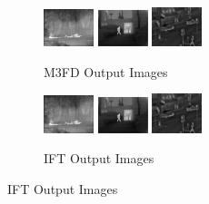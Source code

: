 \begin{figure}[htbp]
    \centering
    \begin{subfigure}[b]{\textwidth}
        \includegraphics[width=0.16\textwidth, height=0.1\textheight]{imgs/ch5/m3fd/20.jpg}
        \includegraphics[width=0.16\textwidth, height=0.1\textheight]{imgs/ch5/m3fd/12.jpg}
        \includegraphics[width=0.16\textwidth, height=0.1\textheight]{imgs/ch5/m3fd/02.jpg}
        \captionsetup{justification=raggedright,singlelinecheck=false}
        \caption{M3FD\cite{liu2022target} Output Images}
        \label{fig:ch5:met9:m3fd}
    \end{subfigure}
    \vspace{0.01cm}
    \begin{subfigure}[b]{\textwidth}
        \includegraphics[width=0.16\textwidth, height=0.1\textheight]{imgs/ch5/swinFusion/20.jpg}
        \includegraphics[width=0.16\textwidth, height=0.1\textheight]{imgs/ch5/swinFusion/12.jpg}
        \includegraphics[width=0.16\textwidth, height=0.1\textheight]{imgs/ch5/swinFusion/02.jpg}
        \captionsetup{justification=raggedright,singlelinecheck=false}
        \caption{IFT\cite{vs2022image} Output Images}
        \label{fig:ch5:met9:ift}
    \end{subfigure}

\end{figure}
